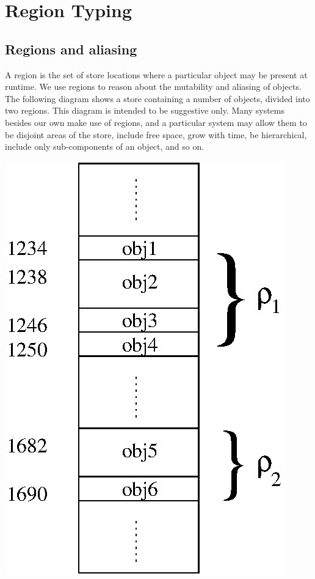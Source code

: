 \clearpage{}
\section{Region Typing}
\label{System:Regions}

\subsection{Regions and aliasing}
A region is the set of store locations where a particular object may be present at runtime. We use regions to reason about the mutability and aliasing of objects. The following diagram shows a store containing a number of objects, divided into two regions. This diagram is intended to be suggestive only. Many systems besides our own make use of regions, and a particular system may allow them to be disjoint areas of the store, include free space, grow with time, be hierarchical, include only sub-components of an object, and so on.

\begin{center}
\includegraphics[scale=0.8]{2-System/fig/regions-inHeap}
\end{center}

